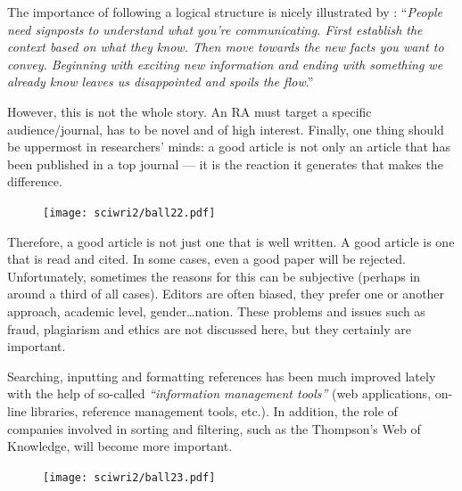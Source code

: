\documentclass[graybox,envcountchap,sectrefs,UStrade]{svmono}
\begin{document}
The importance of following a logical structure is nicely illustrated by \citet{Gopen1990}: ``\emph{People need signposts to understand what you're communicating. First establish the context based on what they know. Then move towards the new facts you want to convey. Beginning with exciting new information and ending with something we already know leaves us disappointed and spoils the flow}.''\par

However, this is not the whole story. An RA must target a specific audience/journal, has to be novel and of high interest. Finally, one thing should be uppermost in researchers' minds: a good article is not only an article that has been published in a top journal --- it is the reaction it generates that makes the difference. \par

\begin{figure}
\vspace{-20pt}
\texttt{[image: sciwri2/ball22.pdf]}
\vspace{-20pt}
\end{figure}

Therefore, a good article is not just one that is well written. A good article is one that is read and cited. In some cases, even a good paper will be rejected. Unfortunately, sometimes the reasons for this can be subjective (perhaps in around a third of all cases). Editors are often biased, they prefer one or another approach, academic level, gender\ldots nation. These problems and issues such as fraud, plagiarism and ethics are not discussed here, but they certainly are important.\par

Searching, inputting and formatting references has been much improved lately with the help of so-called \emph{``information management tools''} (web applications, on-line libraries, reference management tools, etc.). In addition, the role of companies involved in sorting and filtering, such as the Thompson's Web of Knowledge, will become more important. \par

\begin{figure}
\vspace{-20pt}
\texttt{[image: sciwri2/ball23.pdf]}
\vspace{-20pt}
\end{figure}
\end{document}
